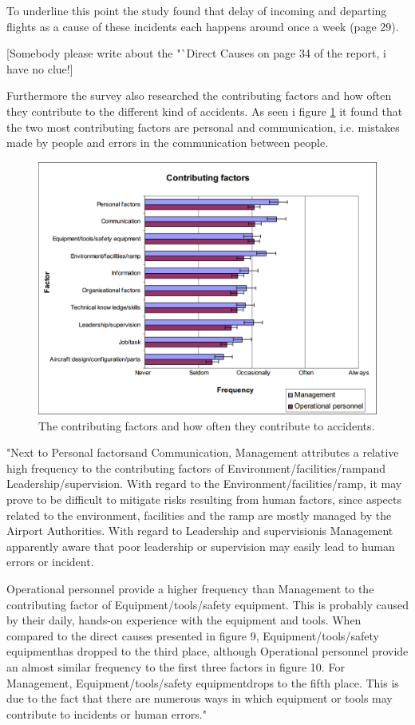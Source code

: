 To underline this point the study found that delay of incoming and departing flights as a cause of these incidents each happens around once a week (page 29).

[Somebody please write about the "`Direct Causes on page 34 of the report, i have no clue!]

Furthermore the survey also researched the contributing factors and how often they contribute to the different kind of accidents. As seen i figure \ref{ContributingFactors} it found that the two most contributing factors are personal and communication, i.e. mistakes made by people and errors in the communication between people.

\begin{figure}
\centering
\includegraphics[width=\textwidth]{Grafik/ContributingFactors}
\caption{The contributing factors and how often they contribute to accidents.}
\label{ContributingFactors}
\end{figure}

"Next to Personal factorsand Communication, Management attributes a relative high frequency to the contributing factors of Environment/facilities/rampand Leadership/supervision. With regard to the Environment/facilities/ramp, it may prove to be difficult to mitigate risks resulting from human factors, since aspects related to the environment, facilities and the ramp are mostly managed by the Airport Authorities. With regard to Leadership and supervisionis Management apparently aware that poor leadership or supervision may easily lead to human errors or incident.

Operational personnel provide a higher frequency than Management to the contributing factor of Equipment/tools/safety equipment. This is probably caused by their daily, hands-on experience with the equipment and tools. When compared to the direct causes presented in figure 9, Equipment/tools/safety equipmenthas dropped to the third place, although Operational personnel provide an almost similar frequency to the first three factors in figure 10. For Management, Equipment/tools/safety equipmentdrops to the fifth place. This is due to the fact that there are numerous ways in which equipment or tools may contribute to incidents or human errors."

